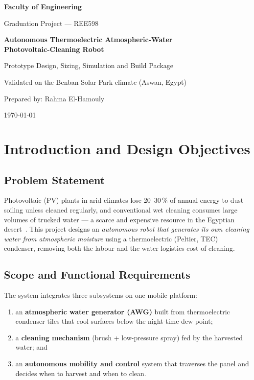 \documentclass[12pt,a4paper]{report}
\newcommand{\SIrange}[3]{#1--#2\,\mbox{#3}}
\newcommand{\percent}{\%}
\begin{document}
\begin{titlepage}
\centering
\vspace*{2cm}
{\Large\bfseries Faculty of Engineering\par}
\vspace{0.5cm}
{\large Graduation Project --- REE598\par}
\vfill
{\Huge\bfseries Autonomous Thermoelectric Atmospheric-Water\\[0.3cm]
Photovoltaic-Cleaning Robot\par}
\vspace{0.8cm}
{\Large Prototype Design, Sizing, Simulation and Build Package\par}
\vfill
{\large Validated on the Benban Solar Park climate (Aswan, Egypt)\par}
\vspace{2cm}
{\large Prepared by: Rahma El-Hamouly\par}
\vspace{0.5cm}
{\large \today\par}
\vfill
\end{titlepage}

\tableofcontents
\listoffigures
\listoftables
\clearpage

\chapter{Introduction and Design Objectives}
\label{ch:intro}

\section{Problem Statement}
Photovoltaic (PV) plants in arid climates lose \SIrange{20}{30}{\percent} of
annual energy to dust soiling unless cleaned regularly, and conventional wet
cleaning consumes large volumes of trucked water --- a scarce and expensive
resource in the Egyptian desert~\cite{kazem2023soiling,caron2013soiling}.
This project designs an \emph{autonomous robot that generates its own cleaning
water from atmospheric moisture} using a thermoelectric (Peltier, TEC) condenser,
removing both the labour and the water-logistics cost of cleaning.

\section{Scope and Functional Requirements}
The system integrates three subsystems on one mobile platform:
\begin{enumerate}
  \item an \textbf{atmospheric water generator (AWG)} built from thermoelectric
        condenser tiles that cool surfaces below the night-time dew point;
  \item a \textbf{cleaning mechanism} (brush + low-pressure spray) fed by the
        harvested water; and
  \item an \textbf{autonomous mobility and control} system that traverses the
        panel and decides when to harvest and when to clean.
\end{enumerate}
\end{document}
